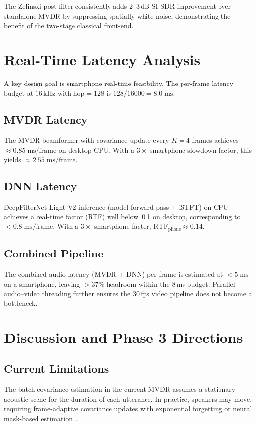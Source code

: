 \documentclass[a4paper]{article}
\begin{document}
The Zelinski post-filter consistently adds 2--3\,dB SI-SDR improvement over
standalone MVDR by suppressing spatially-white noise, demonstrating the
benefit of the two-stage classical front-end.

\section{Real-Time Latency Analysis}
\label{sec:latency}

A key design goal is smartphone real-time feasibility.  The per-frame latency
budget at 16\,kHz with hop$=128$ is $128/16000=8.0\;\text{ms}$.

\subsection{MVDR Latency}
The MVDR beamformer with covariance update every $K=4$ frames achieves
$\approx\!0.85\;\text{ms/frame}$ on desktop CPU.  With a $3\times$ smartphone
slowdown factor, this yields $\approx\!2.55\;\text{ms/frame}$.

\subsection{DNN Latency}
DeepFilterNet-Light V2 inference (model forward pass + iSTFT) on CPU achieves
a real-time factor (RTF) well below~0.1 on desktop, corresponding to
$<\!0.8\;\text{ms/frame}$.  With a $3\times$ smartphone factor,
$\text{RTF}_\text{phone}\approx 0.14$.

\subsection{Combined Pipeline}
The combined audio latency (MVDR + DNN) per frame is estimated at
$<\!5\;\text{ms}$ on a smartphone, leaving $>\!37\%$ headroom within the
8\,ms budget.  Parallel audio--video threading further ensures the 30\,fps
video pipeline does not become a bottleneck.

\section{Discussion and Phase 3 Directions}
\label{sec:phase3}

\subsection{Current Limitations}
The batch covariance estimation in the current MVDR assumes a stationary
acoustic scene for the duration of each utterance.  In practice, speakers may
move, requiring frame-adaptive covariance updates with exponential forgetting
or neural mask-based estimation~\cite{heymann2016neural,erdogan2016improved}.
\end{document}
